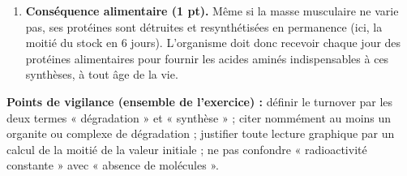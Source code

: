 \documentclass[11pt]{article}
\begin{document}
\begin{corrige}
\begin{enumerate}
\item \textbf{Conséquence alimentaire (1 pt).} Même si la masse musculaire ne varie pas, ses protéines sont détruites et resynthétisées en permanence (ici, la moitié du stock en 6 jours). L'organisme doit donc recevoir chaque jour des protéines alimentaires pour fournir les acides aminés indispensables à ces synthèses, à tout âge de la vie.
\end{enumerate}
\textbf{Points de vigilance (ensemble de l'exercice) :} définir le turnover par les deux termes « dégradation » et « synthèse » ; citer nommément au moins un organite ou complexe de dégradation ; justifier toute lecture graphique par un calcul de la moitié de la valeur initiale ; ne pas confondre « radioactivité constante » avec « absence de molécules ».
\end{corrige}
\end{document}
